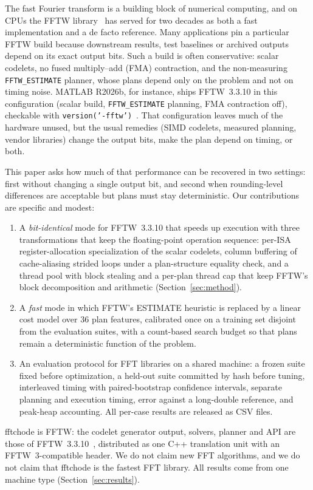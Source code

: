 \documentclass[10pt]{article}
\theoremstyle{definition}
\begin{document}
The fast Fourier transform is a building block of numerical computing, and on CPUs the FFTW library~\cite{frigo2005fftw3} has served for two decades as both a fast implementation and a de facto reference. Many applications pin a particular FFTW build because downstream results, test baselines or archived outputs depend on its exact output bits. Such a build is often conservative: scalar codelets, no fused multiply--add (FMA) contraction, and the non-measuring \texttt{FFTW\_ESTIMATE} planner, whose plans depend only on the problem and not on timing noise. MATLAB R2026b, for instance, ships FFTW~3.3.10 in this configuration (scalar build, \texttt{FFTW\_ESTIMATE} planning, FMA contraction off), checkable with \texttt{version('-fftw')}~\cite{matlabfft}. That configuration leaves much of the hardware unused, but the usual remedies (SIMD codelets, measured planning, vendor libraries) change the output bits, make the plan depend on timing, or both.

This paper asks how much of that performance can be recovered in two settings: first without changing a single output bit, and second when rounding-level differences are acceptable but plans must stay deterministic. Our contributions are specific and modest:
\begin{enumerate}
\item A \emph{bit-identical} mode for FFTW~3.3.10 that speeds up execution with three transformations that keep the floating-point operation sequence: per-ISA register-allocation specialization of the scalar codelets, column buffering of cache-aliasing strided loops under a plan-structure equality check, and a thread pool with block stealing and a per-plan thread cap that keep FFTW's block decomposition and arithmetic (Section~\ref{sec:method}).
\item A \emph{fast} mode in which FFTW's ESTIMATE heuristic is replaced by a linear cost model over 36 plan features, calibrated once on a training set disjoint from the evaluation suites, with a count-based search budget so that plans remain a deterministic function of the problem.
\item An evaluation protocol for FFT libraries on a shared machine: a frozen suite fixed before optimization, a held-out suite committed by hash before tuning, interleaved timing with paired-bootstrap confidence intervals, separate planning and execution timing, error against a long-double reference, and peak-heap accounting. All per-case results are released as CSV files.
\end{enumerate}
fftchode is FFTW: the codelet generator output, solvers, planner and API are those of FFTW~3.3.10~\cite{frigo2005fftw3,fftw3310}, distributed as one C++ translation unit with an FFTW~3-compatible header. We do not claim new FFT algorithms, and we do not claim that fftchode is the fastest FFT library. All results come from one machine type (Section~\ref{sec:results}).
\end{document}

